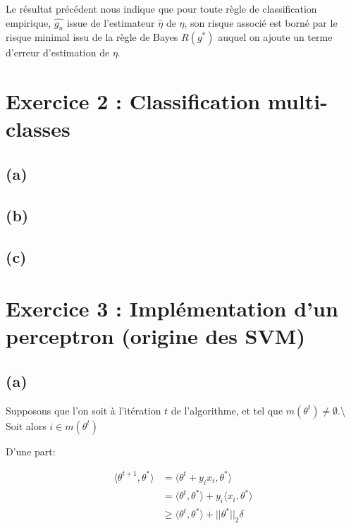 \documentclass[
]{article}
\begin{document}
Le résultat précédent nous indique que pour toute règle de
classification empirique, \(\hat{g_n}\) issue de l'estimateur
\(\hat{\eta}\) de \(\eta\), son risque associé est borné par le risque
minimal issu de la règle de Bayes \(R(g^*)\) auquel on ajoute un terme
d'erreur d'estimation de \(\eta\).

\hypertarget{exercice-2-classification-multi-classes}{%
\section{Exercice 2 : Classification
multi-classes}\label{exercice-2-classification-multi-classes}}

\hypertarget{a-1}{%
\subsection{(a)}\label{a-1}}

\hypertarget{b}{%
\subsection{(b)}\label{b}}

\hypertarget{c}{%
\subsection{(c)}\label{c}}

\hypertarget{exercice-3-impluxe9mentation-dun-perceptron-origine-des-svm}{%
\section{Exercice 3 : Implémentation d'un perceptron (origine des
SVM)}\label{exercice-3-impluxe9mentation-dun-perceptron-origine-des-svm}}

\hypertarget{a-2}{%
\subsection{(a)}\label{a-2}}

Supposons que l'on soit à l'itération \(t\) de l'algorithme, et tel que
\(m(\theta^t) \neq \emptyset\).\textbackslash{} Soit alors
\(i \in m(\theta^t)\)

D'une part:

\begin{align*}
    \langle \theta^{t+1}, \theta^* \rangle & = \langle \theta^{t} + y_i x_i, \theta^* \rangle\\
    & = \langle \theta^{t}, \theta^* \rangle + y_i \langle x_i, \theta^* \rangle\\
    & \geq \langle \theta^{t}, \theta^* \rangle + ||\theta^*||_2 \delta
\end{align*}
\end{document}
